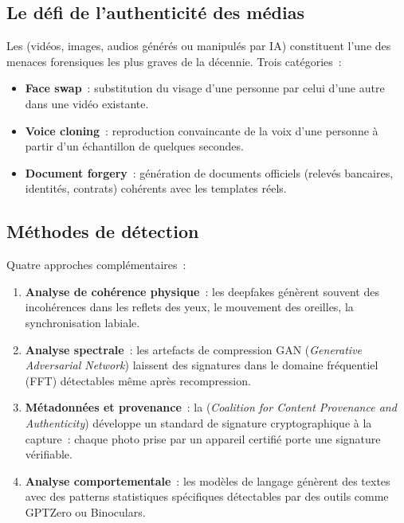 \subsection{Le défi de l'authenticité des médias}

Les  (vidéos, images, audios générés
ou manipulés par IA) constituent l'une des menaces forensiques les plus
graves de la décennie. Trois catégories~:
\begin{itemize}
    \item \textbf{Face swap}~: substitution du visage d'une personne par
          celui d'une autre dans une vidéo existante.
    \item \textbf{Voice cloning}~: reproduction convaincante de la voix
          d'une personne à partir d'un échantillon de quelques secondes.
    \item \textbf{Document forgery}~: génération de documents officiels
          (relevés bancaires, identités, contrats) cohérents avec les
          templates réels.
\end{itemize}

\subsection{Méthodes de détection}

Quatre approches complémentaires~:
\begin{enumerate}
    \item \textbf{Analyse de cohérence physique}~: les deepfakes génèrent
          souvent des incohérences dans les reflets des yeux, le
          mouvement des oreilles, la synchronisation labiale.
    \item \textbf{Analyse spectrale}~: les artefacts de compression GAN
          (\textit{Generative Adversarial Network}) laissent des
          signatures dans le domaine fréquentiel (FFT) détectables
          même après recompression.
    \item \textbf{Métadonnées et provenance}~: la
           (\textit{Coalition for Content
          Provenance and Authenticity}) développe un standard de
          signature cryptographique à la capture~: chaque photo prise
          par un appareil certifié porte une signature vérifiable.
    \item \textbf{Analyse comportementale}~: les modèles de langage
          génèrent des textes avec des patterns statistiques spécifiques
          détectables par des outils comme GPTZero ou Binoculars.
\end{enumerate}

